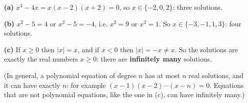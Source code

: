 \textbf{(a)} $x^3-4x=x(x-2)(x+2)=0$, so $x\in\boxed{\{-2,0,2\}}$: three solutions.

\textbf{(b)} $x^2-5=4$ or $x^2-5=-4$, i.e. $x^2=9$ or $x^2=1$. So $x\in\boxed{\{-3,-1,1,3\}}$: four solutions.

\textbf{(c)} If $x\ge0$ then $|x|=x$, and if $x<0$ then $|x|=-x\ne x$. So the solutions are exactly the real numbers $x\ge0$: there are \textbf{infinitely many} solutions.

(In general, a polynomial equation of degree $n$ has at most $n$ real solutions, and it can have exactly $n$: for example $(x-1)(x-2)\cdots(x-n)=0$. Equations that are not polynomial equations, like the one in (c), can have infinitely many.)

